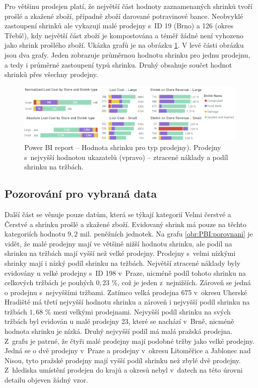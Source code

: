 Pro většinu prodejen platí, že největší část hodnoty zaznamenaných shrinků tvoří prošlé a zkažené zboží, případně zboží darované potravinové bance. Neobvyklé zastoupení shrinků ale vykazují malé prodejny s~ID 19 (Brno) a 126 (okres Třebíč), kdy největší část zboží je kompostována a téměř žádné není vyhozeno jako shrink prošlého zboží. Ukázka grafů je na obrázku \ref*{obr:PBI:topwhs}. V levé části obrázku jsou dva grafy. Jeden zobrazuje průměrnou hodnotu shrinku pro jednu prodejnu, a tedy i průměrné zastoupení typů shrinku. Druhý obsahuje součet hodnot shrinků přes všechny prodejny.

\begin{figure}[h!]
    \centering
    \captionsetup{justification=centering}
    \includegraphics[width=\textwidth]{obrazky/PBI/topwhs.png}
    \caption{Power BI report -- Hodnota shrinku pro typ prodejny). Prodejny s~nejvyšší hodnotou ukazatelů (vpravo) -- ztracené náklady a podíl shrinku na tržbách.}
    \label{obr:PBI:topwhs}
\end{figure}

\subsection*{Pozorování pro vybraná data}

Další část se věnuje pouze datům, která se týkají kategorií Velmi čerstvé a Čerstvé a shrinku prošlé a zkažené zboží. Evidovaný shrink má pouze na těchto kategoriích hodnotu $9{,}2$ mil. peněžních jednotek. 
Na grafu \ref*{obr:PBI:porovnani} je vidět, že malé prodejny mají ve většině nižší hodnotu shrinku, ale podíl na shrinku na tržbách mají vyšší než velké prodejny. Prodejny s~velmi nízkými shrinky mají i nízký podíl shrinku na tržbách. 
Největší ztracené náklady byly evidovány u velké prodejny s~ID 198 v~Praze, nicméně podíl tohoto shrinku na celkových tržbách je pouhých $0{,}23$ \%, což je jeden z~nejnižších. Zároveň se jedná o prodejnu s~nejvyššími tržbami. Zatímco velká prodejna 675 v~okresu Uherské Hradiště má třetí nejvyšší hodnotu shrinku a zároveň i nejvyšší podíl shrinku na tržbách $1{,}68$ \% mezi velkými prodejnami. 
Nejvyšší podíl shrinku na svých tržbách byl evidován u malé prodejny 23, které se nachází v~Brně, nicméně hodnota shrinku je nízká. Druhý nejvyšší podíl má malá pražská prodejna.
Z~grafu je patrné, že čtyři malé prodejny mají podobné tržby jako velké prodejny. Jedná se o dvě prodejny v~Praze a prodejny v~okresu Litoměřice a Jablonec nad Nisou, tyto pražské prodejny mají vyšší podíl shrinku než zbylé dvě prodejny.
Z~hlediska umístění prodejen do krajů a okresů nebyl v~datech na této úrovni detailu objeven žádný vzor.

